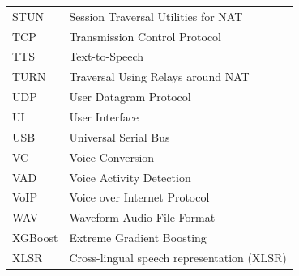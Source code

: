 \begin{longtable}{@{}p{5cm} p{11cm}}
STUN      & Session Traversal Utilities for NAT \\[0.2cm]
TCP       & Transmission Control Protocol \\[0.2cm]
TTS       & Text-to-Speech \\[0.2cm]
TURN      & Traversal Using Relays around NAT \\[0.2cm]
UDP       & User Datagram Protocol \\[0.2cm]
UI        & User Interface \\[0.2cm]
USB       & Universal Serial Bus \\[0.2cm]
VC        & Voice Conversion \\[0.2cm]
VAD       & Voice Activity Detection \\[0.2cm]
VoIP      & Voice over Internet Protocol \\[0.2cm]
WAV       & Waveform Audio File Format \\[0.2cm]
XGBoost   & Extreme Gradient Boosting \\[0.2cm]
XLSR      & Cross-lingual speech representation (XLSR) \\[0.2cm]

\end{longtable}